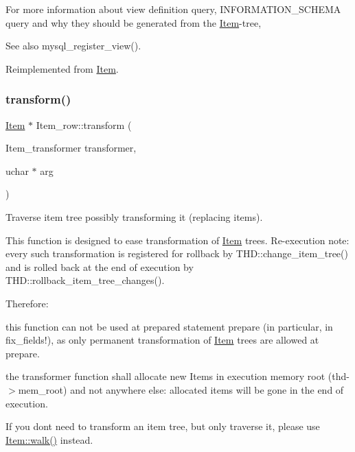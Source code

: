 For more information about view definition query, I\+N\+F\+O\+R\+M\+A\+T\+I\+O\+N\+\_\+\+S\+C\+H\+E\+MA query and why they should be generated from the \mbox{\hyperlink{classItem}{Item}}-\/tree, \begin{DoxySeeAlso}{See also}
mysql\+\_\+register\+\_\+view(). 
\end{DoxySeeAlso}


Reimplemented from \mbox{\hyperlink{classItem_aa7ba4bde739d83adec8edf3bf1596d94}{Item}}.

\mbox{\label{classItem__row_a708898ec64fe61e228a0f345d1657afb}} 
\subsubsection{\texorpdfstring{transform()}{transform()}}
{\footnotesize\ttfamily \mbox{\hyperlink{classItem}{Item}} $\ast$ Item\+\_\+row\+::transform (\begin{DoxyParamCaption}\item[{Item\+\_\+transformer}]{transformer,  }\item[{uchar $\ast$}]{arg }\end{DoxyParamCaption})\hspace{0.3cm}{\ttfamily [virtual]}}

Traverse item tree possibly transforming it (replacing items).

This function is designed to ease transformation of \mbox{\hyperlink{classItem}{Item}} trees. Re-\/execution note\+: every such transformation is registered for rollback by T\+H\+D\+::change\+\_\+item\+\_\+tree() and is rolled back at the end of execution by T\+H\+D\+::rollback\+\_\+item\+\_\+tree\+\_\+changes().

Therefore\+:
\begin{DoxyItemize}
\item this function can not be used at prepared statement prepare (in particular, in fix\+\_\+fields!), as only permanent transformation of \mbox{\hyperlink{classItem}{Item}} trees are allowed at prepare.
\item the transformer function shall allocate new Items in execution memory root (thd-\/$>$mem\+\_\+root) and not anywhere else\+: allocated items will be gone in the end of execution.
\end{DoxyItemize}

If you don\textquotesingle{}t need to transform an item tree, but only traverse it, please use \mbox{\hyperlink{classItem_ab7d2529511c14a77e59a1b1bbabc95d7}{Item\+::walk()}} instead.


